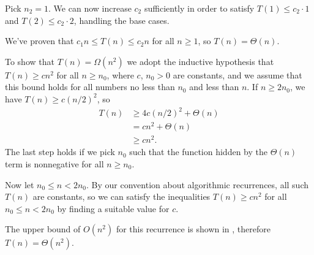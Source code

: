 Pick $n_2=1$.
We can now increase $c_2$ sufficiently in order to satisfy $T(1)\le c_2\cdot1$ and $T(2)\le c_2\cdot2$, handling the base cases.

We've proven that $c_1n\le T(n)\le c_2n$ for all $n\ge1$, so $T(n)=\Theta(n)$.

\subexercise
To show that $T(n)=\Omega(n^2)$ we adopt the inductive hypothesis that $T(n)\ge cn^2$ for all $n\ge n_0$, where $c$, $n_0>0$ are constants, and we assume that this bound holds for all numbers no less than $n_0$ and less than $n$.
If $n\ge2n_0$, we have $T(n)\ge c(n/2)^2$, so
\begin{align*}
    T(n) &\ge 4c(n/2)^2+\Theta(n) \\
    &= cn^2+\Theta(n) \\
    &\ge cn^2.
\end{align*}
The last step holds if we pick $n_0$ such that the function hidden by the $\Theta(n)$ term is nonnegative for all $n\ge n_0$.

Now let $n_0\le n<2n_0$.
By our convention about algorithmic recurrences, all such $T(n)$ are constants, so we can satisfy the inequalities $T(n)\ge cn^2$ for all $n_0\le n<2n_0$ by finding a suitable value for $c$.

The upper bound of $O(n^2)$ for this recurrence is shown in , therefore $T(n)=\Theta(n^2)$.
